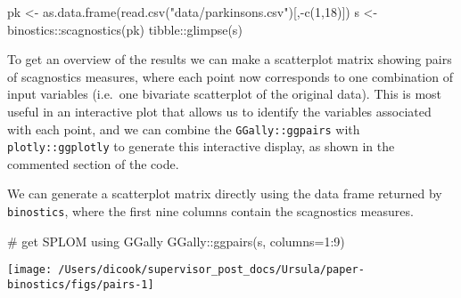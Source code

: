 \begin{Schunk}
\begin{Sinput}
pk <- as.data.frame(read.csv("data/parkinsons.csv")[,-c(1,18)])
s <- binostics::scagnostics(pk)
tibble::glimpse(s)
\end{Sinput}
\end{Schunk}

To get an overview of the results we can make a scatterplot matrix
showing pairs of scagnostics measures, where each point now corresponds
to one combination of input variables (i.e.~one bivariate scatterplot of
the original data). This is most useful in an interactive plot that
allows us to identify the variables associated with each point, and we
can combine the \texttt{GGally::ggpairs} with \texttt{plotly::ggplotly}
to generate this interactive display, as shown in the commented section
of the code.

We can generate a scatterplot matrix directly using the data frame
returned by \texttt{binostics}, where the first nine columns contain the
scagnostics measures.

\begin{Schunk}
\begin{Sinput}
# get SPLOM using GGally
GGally::ggpairs(s, columns=1:9)
\end{Sinput}


\begin{center}\texttt{[image: /Users/dicook/supervisor\_post\_docs/Ursula/paper-binostics/figs/pairs-1]} \end{center}

\end{Schunk}

